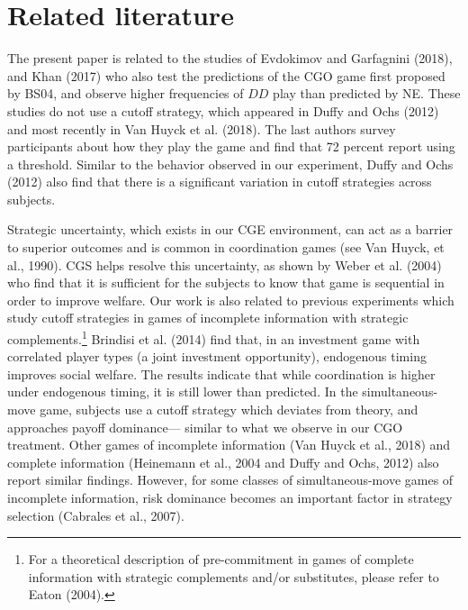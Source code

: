\documentclass[12pt,english]{article}
\begin{document}
\section{Related literature}

The present paper is related to the studies of Evdokimov and Garfagnini (2018), and Khan (2017) who also test the predictions of the CGO game first proposed by BS04, and observe higher frequencies of $DD$ play than predicted by NE. These studies do not use a cutoff strategy, which appeared in Duffy and Ochs (2012) and most recently in Van Huyck et al. (2018). The last authors survey participants about how they play the game and find that 72 percent report using a threshold. Similar to the behavior observed in our experiment, Duffy and Ochs (2012) also find that there is a significant variation in cutoff strategies across subjects. 

Strategic uncertainty, which exists in our CGE environment, can act as a barrier to superior outcomes and is common in coordination games (see Van Huyck, et al., 1990). CGS helps resolve this uncertainty, as shown by Weber et al. (2004) who find that it is sufficient for the subjects to know that game is sequential in order to improve welfare. Our work is also related to previous experiments which study cutoff strategies in games of incomplete information with strategic complements.\footnote{For a theoretical description of pre-commitment in games of complete information with strategic complements and/or substitutes, please refer to Eaton (2004).} Brindisi et al. (2014) find that, in an investment game with correlated player types (a joint investment opportunity), endogenous timing improves social welfare. The results indicate that while coordination is higher under endogenous timing, it is still lower than predicted. In the simultaneous-move game, subjects use a cutoff strategy which deviates from theory, and approaches payoff dominance--- similar to what we observe in our CGO treatment. Other games of incomplete information (Van Huyck et al., 2018) and complete information (Heinemann et al., 2004 and Duffy and Ochs, 2012) also report similar findings. However, for some classes of simultaneous-move games of incomplete information, risk dominance becomes an important factor in strategy selection (Cabrales et al., 2007).
\end{document}
